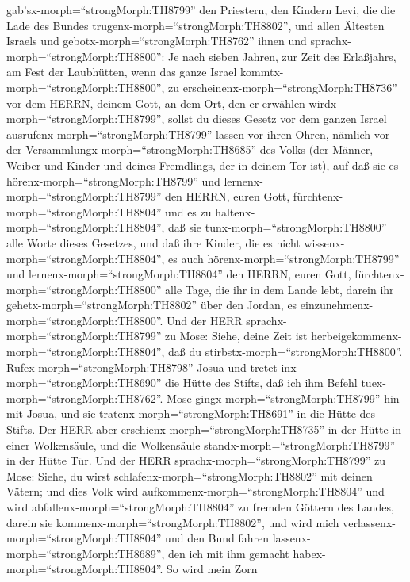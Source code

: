 gab'sx-morph=``strongMorph:TH8799'' den Priestern, den Kindern Levi, die
die Lade des Bundes trugenx-morph=``strongMorph:TH8802'', und allen
Ältesten Israels  und gebotx-morph=``strongMorph:TH8762''
ihnen und sprachx-morph=``strongMorph:TH8800'': Je nach sieben Jahren,
zur Zeit des Erlaßjahrs, am Fest der Laubhütten,  wenn das
ganze Israel kommtx-morph=``strongMorph:TH8800'', zu
erscheinenx-morph=``strongMorph:TH8736'' vor dem HERRN, deinem Gott, an
dem Ort, den er erwählen wirdx-morph=``strongMorph:TH8799'', sollst du
dieses Gesetz vor dem ganzen Israel
ausrufenx-morph=``strongMorph:TH8799'' lassen vor ihren Ohren,
 nämlich vor der Versammlungx-morph=``strongMorph:TH8685''
des Volks (der Männer, Weiber und Kinder und deines Fremdlings, der in
deinem Tor ist), auf daß sie es hörenx-morph=``strongMorph:TH8799'' und
lernenx-morph=``strongMorph:TH8799'' den HERRN, euren Gott,
fürchtenx-morph=``strongMorph:TH8804'' und es zu
haltenx-morph=``strongMorph:TH8804'', daß sie
tunx-morph=``strongMorph:TH8800'' alle Worte dieses Gesetzes,
 und daß ihre Kinder, die es nicht
wissenx-morph=``strongMorph:TH8804'', es auch
hörenx-morph=``strongMorph:TH8799'' und
lernenx-morph=``strongMorph:TH8804'' den HERRN, euren Gott,
fürchtenx-morph=``strongMorph:TH8800'' alle Tage, die ihr in dem Lande
lebt, darein ihr gehetx-morph=``strongMorph:TH8802'' über den Jordan, es
einzunehmenx-morph=``strongMorph:TH8800''.  Und der HERR
sprachx-morph=``strongMorph:TH8799'' zu Mose: Siehe, deine Zeit ist
herbeigekommenx-morph=``strongMorph:TH8804'', daß du
stirbstx-morph=``strongMorph:TH8800''.
Rufex-morph=``strongMorph:TH8798'' Josua und tretet
inx-morph=``strongMorph:TH8690'' die Hütte des Stifts, daß ich ihm
Befehl tuex-morph=``strongMorph:TH8762''. Mose
gingx-morph=``strongMorph:TH8799'' hin mit Josua, und sie
tratenx-morph=``strongMorph:TH8691'' in die Hütte des Stifts.
 Der HERR aber erschienx-morph=``strongMorph:TH8735'' in
der Hütte in einer Wolkensäule, und die Wolkensäule
standx-morph=``strongMorph:TH8799'' in der Hütte Tür.  Und
der HERR sprachx-morph=``strongMorph:TH8799'' zu Mose: Siehe, du wirst
schlafenx-morph=``strongMorph:TH8802'' mit deinen Vätern; und dies Volk
wird aufkommenx-morph=``strongMorph:TH8804'' und wird
abfallenx-morph=``strongMorph:TH8804'' zu fremden Göttern des Landes,
darein sie kommenx-morph=``strongMorph:TH8802'', und wird mich
verlassenx-morph=``strongMorph:TH8804'' und den Bund fahren
lassenx-morph=``strongMorph:TH8689'', den ich mit ihm gemacht
habex-morph=``strongMorph:TH8804''.  So wird mein Zorn
